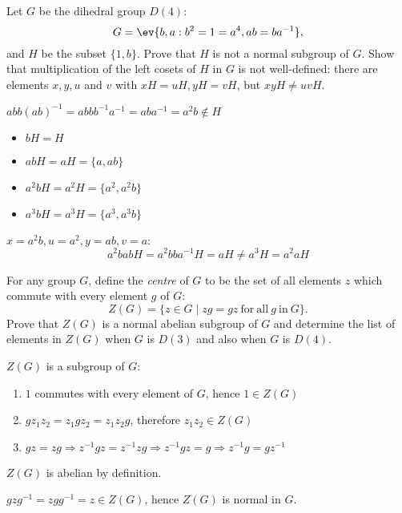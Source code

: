 \begin{exercise}
    Let \(G\) be the dihedral group \(D(4)\):
    \[G = \ev{b, a : b^2 = 1 = a^4, ab = ba^{ - 1}},\]
    and \(H\) be the subset \(\{1, b\}\). Prove that \(H\) is not a normal subgroup of \(G\). Show that multiplication of the left cosets of \(H\) in \(G\) is not well-defined: there are elements \(x,y,u\) and \(v\) with \(xH = uH, yH = vH\), but \(xyH \neq uvH\).
\end{exercise}
\begin{solution}
    \(ab b (ab)^{ - 1} = ab b b^{ - 1}a^{ - 1} = aba^{ - 1} = a^2b \notin H\)

    \begin{itemize}
        \item \(bH = H\)
        \item \(abH = aH = \{a, ab\}\)
        \item \(a^2bH = a^2H = \{a^2, a^2b\}\)
        \item \(a^3bH = a^3H = \{a^3, a^3b\}\)
    \end{itemize}

    \(x = a^2b, u = a^2, y = ab, v = a\):
    \[a^2babH = a^2bba^{ - 1}H = aH \neq a^3H = a^2aH\]
\end{solution}

\begin{exercise}
    For any group \(G\), define the \textit{centre} of \(G\) to be the set of all elements \(z\) which commute with every element \(g\) of \(G\):
    \[Z(G) = \{z \in G \mid zg = gz\ \mathrm{for\ all}\ g\ \mathrm{in}\ G\}.\]
    Prove that \(Z(G)\) is a normal abelian subgroup of \(G\) and determine the list of elements in \(Z(G)\) when \(G\) is \(D(3)\) and also when \(G\) is \(D(4)\).
\end{exercise}
\begin{solution}
    \(Z(G)\) is a subgroup of \(G\):
    \begin{enumerate}
        \item \(1\) commutes with every element of \(G\), hence \(1 \in Z(G)\)
        \item \(gz_1z_2 = z_1gz_2 = z_1z_2g\), therefore \(z_1z_2 \in Z(G)\)
        \item \(gz = zg \Rightarrow z^{ - 1}gz = z^{ - 1} zg \Rightarrow z^{ - 1}gz = g \Rightarrow z^{ - 1} g = gz^{ - 1}\)
    \end{enumerate}

    \(Z(G)\) is abelian by definition.

    \(gzg^{ - 1} = zg g^{ - 1} = z \in Z(G)\), hence \(Z(G)\) is normal in \(G\).
\end{solution}
